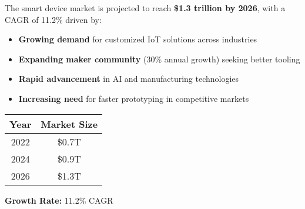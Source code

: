 \begin{tcolorbox}[
    colback=fabLight!30,
    colframe=fabAccent,
    arc=4pt,
    boxrule=1pt,
    title={\textbf{Global Smart Device Market}},
    fonttitle=\large,
    coltitle=fabAccent
]

\begin{minipage}{0.68\textwidth}
The smart device market is projected to reach \textbf{\$1.3 trillion by 2026}, with a CAGR of 11.2\% driven by:

\vspace{0.2cm}
\begin{itemize}
    \item[\textcolor{fabAccent}{\faArrowCircleUp}] \textbf{Growing demand} for customized IoT solutions across industries
    \item[\textcolor{fabAccent}{\faUsers}] \textbf{Expanding maker community} (30\% annual growth) seeking better tooling
    \item[\textcolor{fabAccent}{\faCog}] \textbf{Rapid advancement} in AI and manufacturing technologies
    \item[\textcolor{fabAccent}{\faRocket}] \textbf{Increasing need} for faster prototyping in competitive markets
\end{itemize}
\end{minipage}
\hfill
\begin{minipage}{0.28\textwidth}
\centering
\vspace{0.5cm}
\begin{tabular}{|c|c|}
\hline
\textbf{Year} & \textbf{Market Size} \\
\hline
2022 & \$0.7T \\
2024 & \$0.9T \\
2026 & \$1.3T \\
\hline
\end{tabular}
\vspace{0.2cm}

\textcolor{fabAccent}{\faArrowCircleUp}
\textbf{Growth Rate:} 11.2\% CAGR
\end{minipage}
\end{tcolorbox}

\vspace{0.8cm}

